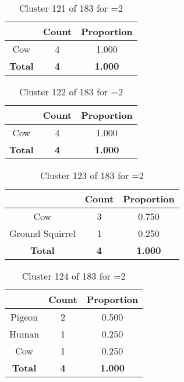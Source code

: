 \begin{table}[ht!]
\centering
\begin{tabular}{|c|c|c|}
\hline
\bf \Spec{} &\bf Count &\bf Proportion\\ \hline \hline
Cow & 4 & 1.000\\ \hline
\hline
\bf Total & \bf 4 & \bf 1.000\\ \hline
\end{tabular}
\label{tab:cluster:121:2}
\caption{Cluster 121 of 183 for \minneigh{}=2}
\end{table}

\begin{table}[ht!]
\centering
\begin{tabular}{|c|c|c|}
\hline
\bf \Spec{} &\bf Count &\bf Proportion\\ \hline \hline
Cow & 4 & 1.000\\ \hline
\hline
\bf Total & \bf 4 & \bf 1.000\\ \hline
\end{tabular}
\label{tab:cluster:122:2}
\caption{Cluster 122 of 183 for \minneigh{}=2}
\end{table}

\begin{table}[ht!]
\centering
\begin{tabular}{|c|c|c|}
\hline
\bf \Spec{} &\bf Count &\bf Proportion\\ \hline \hline
Cow & 3 & 0.750\\ \hline
Ground Squirrel & 1 & 0.250\\ \hline
\hline
\bf Total & \bf 4 & \bf 1.000\\ \hline
\end{tabular}
\label{tab:cluster:123:2}
\caption{Cluster 123 of 183 for \minneigh{}=2}
\end{table}

\begin{table}[ht!]
\centering
\begin{tabular}{|c|c|c|}
\hline
\bf \Spec{} &\bf Count &\bf Proportion\\ \hline \hline
Pigeon & 2 & 0.500\\ \hline
Human & 1 & 0.250\\ \hline
Cow & 1 & 0.250\\ \hline
\hline
\bf Total & \bf 4 & \bf 1.000\\ \hline
\end{tabular}
\label{tab:cluster:124:2}
\caption{Cluster 124 of 183 for \minneigh{}=2}
\end{table}


